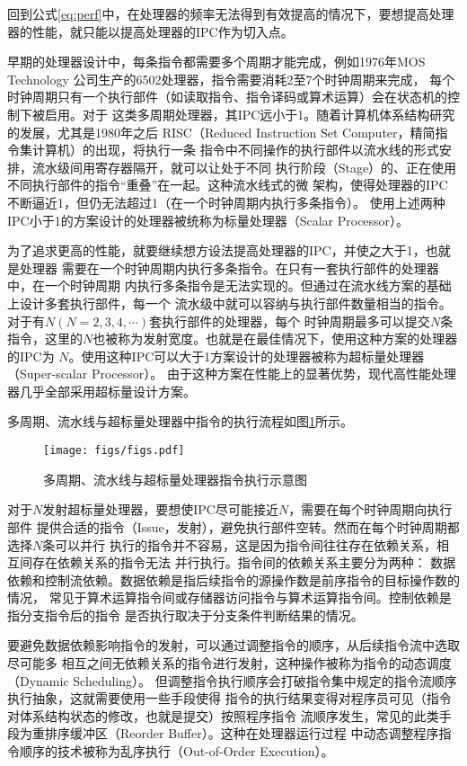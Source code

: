 回到公式\ref{eq:perf}中，在处理器的频率无法得到有效提高的情况下，要想提高处理
器的性能，就只能以提高处理器的IPC作为切入点。

早期的处理器设计中，每条指令都需要多个周期才能完成，例如1976年MOS Technology
公司生产的6502处理器，指令需要消耗2至7个时钟周期来完成\cite{6502manual}，
每个时钟周期只有一个执行部件（如读取指令、指令译码或算术运算）会在状态机的控制下被启用。对于
这类多周期处理器，其IPC远小于1。随着计算机体系结构研究的发展，尤其是1980年之后
RISC（Reduced Instruction Set Computer，精简指令集计算机）的出现，将执行一条
指令中不同操作的执行部件以流水线的形式安排，流水级间用寄存器隔开，就可以让处于不同
执行阶段（Stage）的、正在使用不同执行部件的指令“重叠”在一起。这种流水线式的微
架构，使得处理器的IPC不断逼近1，但仍无法超过1（在一个时钟周期内执行多条指令）。
使用上述两种IPC小于1的方案设计的处理器被统称为标量处理器（Scalar Processor）。

为了追求更高的性能，就要继续想方设法提高处理器的IPC，并使之大于1，也就是处理器
需要在一个时钟周期内执行多条指令。在只有一套执行部件的处理器中，在一个时钟周期
内执行多条指令是无法实现的。但通过在流水线方案的基础上设计多套执行部件，每一个
流水级中就可以容纳与执行部件数量相当的指令。对于有$N(N = 2,3,4,\cdots)$套执行部件的处理器，每个
时钟周期最多可以提交$N$条指令，这里的$N$也被称为发射宽度。也就是在最佳情况下，使用这种方案的处理器的IPC为
$N$。使用这种IPC可以大于1方案设计的处理器被称为超标量处理器（Super-scalar Processor）。
由于这种方案在性能上的显著优势，现代高性能处理器几乎全部采用超标量设计方案。

多周期、流水线与超标量处理器中指令的执行流程如图\ref{fig:exec-cmp}所示。

\begin{figure}[ht]
	\centering
	\texttt{[image: figs/figs.pdf]}
	\caption{多周期、流水线与超标量处理器指令执行示意图}
	\label{fig:exec-cmp}
\end{figure}

对于$N$发射超标量处理器，要想使IPC尽可能接近$N$，需要在每个时钟周期向执行部件
提供合适的指令（Issue，发射），避免执行部件空转。然而在每个时钟周期都选择$N$条可以并行
执行的指令并不容易，这是因为指令间往往存在依赖关系，相互间存在依赖关系的指令无法
并行执行。指令间的依赖关系主要分为两种：
数据依赖和控制流依赖。数据依赖是指后续指令的源操作数是前序指令的目标操作数的情况，
常见于算术运算指令间或存储器访问指令与算术运算指令间。控制依赖是指分支指令后的指令
是否执行取决于分支条件判断结果的情况。

要避免数据依赖影响指令的发射，可以通过调整指令的顺序，从后续指令流中选取尽可能多
相互之间无依赖关系的指令进行发射，这种操作被称为指令的动态调度（Dynamic Scheduling）。
但调整指令执行顺序会打破指令集中规定的指令流顺序执行抽象，这就需要使用一些手段使得
指令的执行结果变得对程序员可见（指令对体系结构状态的修改，也就是提交）按照程序指令
流顺序发生，常见的此类手段为重排序缓冲区（Reorder Buffer）。这种在处理器运行过程
中动态调整程序指令顺序的技术被称为乱序执行（Out-of-Order Execution）。

